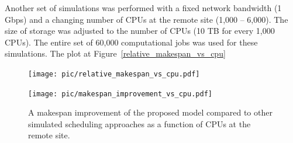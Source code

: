 \documentclass{svjour3}                     %
\begin{document}
Another set of simulations was performed with a fixed network bandwidth (1 Gbps) and a changing number of CPUs at the remote site (1,000 -- 6,000). The size of storage was adjusted to the number of CPUs (10 TB for every 1,000 CPUs). The entire set of 60,000 computational jobs was used for these simulations. The plot at Figure~\ref{relative_makespan_vs_cpu} 
%
\begin{figure}
\centering
\begin{minipage}{1\textwidth}
\centering
    \texttt{[image: pic/relative\_makespan\_vs\_cpu.pdf]}
    \caption{A dependence of a data production makespan on the number of CPUs available at the remote node which is connected over 1 Gbps link to the central storage. %
    The makespan unit is set to 116 days, 4 hours, 16 minutes and 2 seconds which is the makespan of no\_network approach with 1,000 CPUs.}
    \label{relative_makespan_vs_cpu}
\end{minipage}\hspace{3mm}%

\begin{minipage}{1\textwidth}
\centering
    \texttt{[image: pic/makespan\_improvement\_vs\_cpu.pdf]}
    \caption{A makespan improvement of the proposed model compared to other simulated scheduling approaches as a function of CPUs at the remote site. %
    }
    \label{makespan_improvement_vs_cpu}
\end{minipage} 
\end{figure}
%
\end{document}
